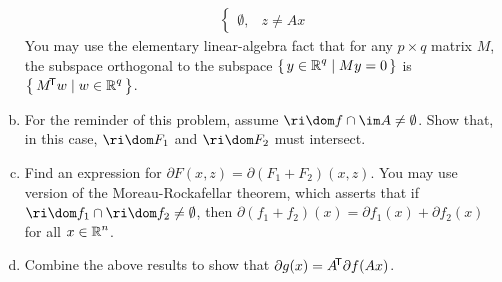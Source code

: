 \documentclass{article}
\begin{document}
\begin{problem}
\begin{enumerate}[(a)]
{\begin{align*}
\begin{cases}
                    \emptyset, & z\neq Ax
                \end{cases}
            \end{align*}
        }
        You may use the elementary linear-algebra fact that for any $p\times q$ matrix $M$, the subspace orthogonal to the subspace $\left\lbrace\,y\in\operatorname{\mathbb{R}}^q\mid My=0\,\right\rbrace$ is $\left\lbrace\,M\!^{\mathsf{T}} w\mid w\in\operatorname{\mathbb{R}}^q\,\right\rbrace$.
        \item For the reminder of this problem, assume $\ri\dom f \cap \im A\neq\emptyset$. Show that, in this case, $\ri\dom F_1$ and $\ri \dom F_2$ must intersect.
        \item Find an expression for $\partial F(x,z)=\partial(F_1+F_2)(x,z).$ You may use version of the Moreau-Rockafellar theorem, which asserts that if $\ri\dom f_1\cap\ri\dom f_2\neq\emptyset$, then $\partial(f_1+f_2)(x)=\partial f_1(x)+\partial f_2(x)$ for all $x\in\operatorname{\mathbb{R}}^n$.
        \item Combine the above results to show that $\partial g(x)=A\!^{\mathsf{T}}\partial f(Ax)$.
    \end{enumerate}
\end{problem}
\end{document}
